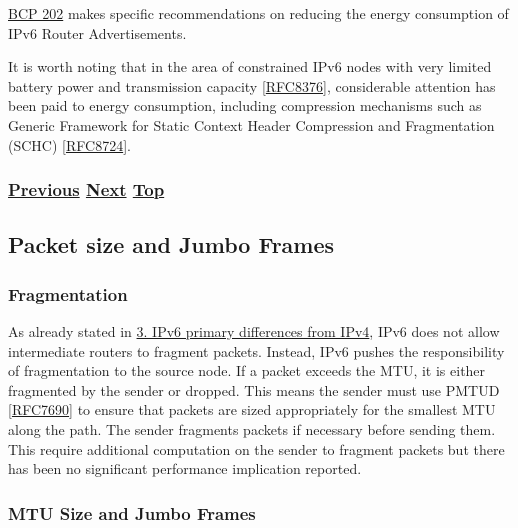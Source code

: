 \documentclass[
]{article}
\begin{document}
\href{https://www.rfc-editor.org/info/bcp202}{BCP 202} makes specific
recommendations on reducing the energy consumption of IPv6 Router
Advertisements.

It is worth noting that in the area of constrained IPv6 nodes with very
limited battery power and transmission capacity
{[}\href{https://www.rfc-editor.org/info/rfc8376}{RFC8376}{]},
considerable attention has been paid to energy consumption, including
compression mechanisms such as Generic Framework for Static Context
Header Compression and Fragmentation (SCHC)
{[}\href{https://www.rfc-editor.org/info/rfc8724}{RFC8724}{]}.

\subsubsection{\texorpdfstring{\hyperref[multihoming]{Previous}
\hyperref[packet-size-and-jumbo-frames]{Next}
\hyperref[management-and-operations]{Top}}{Previous Next Top}}\label{previous-next-top-32}

\pagebreak

\subsection{Packet size and Jumbo
Frames}\label{packet-size-and-jumbo-frames}

\subsubsection{Fragmentation}\label{fragmentation}

As already stated in \hyperref[ipv6-primary-differences-from-ipv4]{3.
IPv6 primary differences from IPv4}, IPv6 does not allow intermediate
routers to fragment packets. Instead, IPv6 pushes the responsibility of
fragmentation to the source node. If a packet exceeds the MTU, it is
either fragmented by the sender or dropped. This means the sender must
use PMTUD {[}\href{https://www.rfc-editor.org/info/rfc7690}{RFC7690}{]}
to ensure that packets are sized appropriately for the smallest MTU
along the path. The sender fragments packets if necessary before sending
them. This require additional computation on the sender to fragment
packets but there has been no significant performance implication
reported.

\subsubsection{MTU Size and Jumbo
Frames}\label{mtu-size-and-jumbo-frames}
\end{document}
